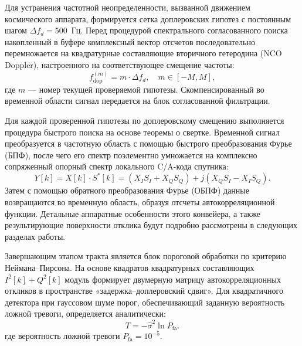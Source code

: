 Для устранения частотной неопределенности, вызванной движением космического аппарата, формируется сетка доплеровских гипотез с постоянным шагом $\Delta f_d = 500$~Гц. Перед процедурой спектрального согласованного поиска накопленный в буфере комплексный вектор отсчетов последовательно перемножается на квадратурные составляющие вторичного гетеродина (NCO Doppler), настроенного на соответствующее смещение частоты:
\begin{equation}
    f_{\text{dop}}^{(m)} = m \cdot \Delta f_d, \quad m \in [-M, M],
\end{equation}
где $m$ — номер текущей проверяемой гипотезы. Скомпенсированный во временной области сигнал передается на блок согласованной фильтрации.

Для каждой проверенной гипотезы по доплеровскому смещению выполняется процедура быстрого поиска на основе теоремы о свертке. Временной сигнал преобразуется в частотную область с помощью быстрого преобразования Фурье (БПФ), после чего его спектр поэлементно умножается на комплексно сопряженный опорный спектр локального C/A-кода спутника:
\begin{equation}
    Y[k] = X[k] \cdot S^*[k] = (X_I S_I + X_Q S_Q) + j(X_Q S_I - X_I S_Q).
\end{equation}
Затем с помощью обратного преобразования Фурье (ОБПФ) данные возвращаются во временную область, образуя отсчеты автокорреляционной функции. Детальные аппаратные особенности этого конвейера, а также результирующие поверхности отклика будут подробно рассмотрены в следующих разделах работы.

Завершающим этапом тракта является блок пороговой обработки по критерию Неймана--Пирсона. На основе квадратов квадратурных составляющих $I^2[k] + Q^2[k]$ модуль формирует двумерную матрицу автокорреляционных откликов в пространстве «задержка--доплеровский сдвиг». Для квадратичного детектора при гауссовом шуме порог, обеспечивающий заданную вероятность ложной тревоги, определяется аналитически:
\begin{equation}
T = -\hat{\sigma}^2 \ln P_{\text{fa}}.
\end{equation}
где вероятность ложной тревоги $P_{\text{fa}} = 10 ^{-5}$.
